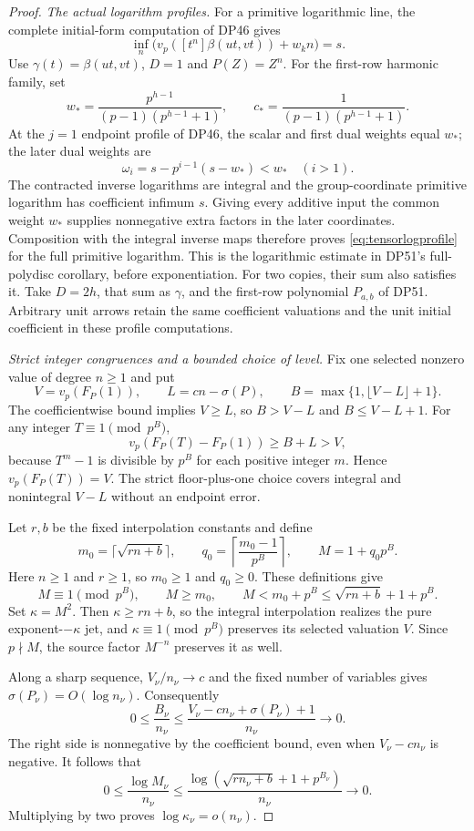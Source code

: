 \documentclass[11pt,a4paper]{article}
\theoremstyle{definition}\newtheorem{remark}[theorem]{Remark}
\begin{document}
\begin{proof}
\emph{The actual logarithm profiles.}
For a primitive logarithmic line, the complete initial-form computation of DP46 gives
\[
 \inf_n\bigl(v_p([t^n]\beta(ut,vt))+w_kn\bigr)=s.
\]
Use $\gamma(t)=\beta(ut,vt)$, $D=1$ and $P(Z)=Z^n$.
For the first-row harmonic family, set
\[
 w_*=\frac{p^{h-1}}{(p-1)(p^{h-1}+1)},
 \qquad c_*=\frac1{(p-1)(p^{h-1}+1)}.
\]
At the $j=1$ endpoint profile of DP46, the scalar and first dual weights equal $w_*$; the later dual weights are
\[
 \omega_i=s-p^{i-1}(s-w_*)<w_*\quad(i>1).
\]
The contracted inverse logarithms are integral and the group-coordinate primitive logarithm has coefficient infimum $s$.
Giving every additive input the common weight $w_*$ supplies nonnegative extra factors in the later coordinates.
Composition with the integral inverse maps therefore proves \eqref{eq:tensorlogprofile} for the full primitive logarithm.
This is the logarithmic estimate in DP51's full-polydisc corollary, before exponentiation.
For two copies, their sum also satisfies it. Take $D=2h$, that sum as $\gamma$, and the first-row polynomial $P_{a,b}$ of DP51.
Arbitrary unit arrows retain the same coefficient valuations and the unit initial coefficient in these profile computations.

\emph{Strict integer congruences and a bounded choice of level.}
Fix one selected nonzero value of degree $n\ge1$ and put
\[
 V=v_p(F_P(1)),\qquad L=cn-\sigma(P),\qquad
 B=\max\{1,\lfloor V-L\rfloor+1\}.
\]
The coefficientwise bound implies $V\ge L$, so $B>V-L$ and $B\le V-L+1$.
For any integer $T\equiv1\pmod{p^B}$,
\[
 v_p(F_P(T)-F_P(1))\ge B+L>V,
\]
because $T^m-1$ is divisible by $p^B$ for each positive integer $m$.
Hence $v_p(F_P(T))=V$.
The strict floor-plus-one choice covers integral and nonintegral $V-L$ without an endpoint error.

Let $r,b$ be the fixed interpolation constants and define
\[
 m_0=\lceil\sqrt{rn+b}\rceil,\qquad
 q_0=\left\lceil\frac{m_0-1}{p^B}\right\rceil,
 \qquad M=1+q_0p^B.
\]
Here $n\ge1$ and $r\ge1$, so $m_0\ge1$ and $q_0\ge0$.
These definitions give
\[
 M\equiv1\pmod{p^B},\qquad
 M\ge m_0,\qquad
 M<m_0+p^B\le\sqrt{rn+b}+1+p^B.
\]
Set $\kappa=M^2$. Then $\kappa\ge rn+b$, so the integral interpolation realizes the pure exponent-$-\kappa$ jet, and $\kappa\equiv1\pmod{p^B}$ preserves its selected valuation $V$.
Since $p\nmid M$, the source factor $M^{-n}$ preserves it as well.

Along a sharp sequence, $V_\nu/n_\nu\to c$ and the fixed number of variables gives $\sigma(P_\nu)=O(\log n_\nu)$.
Consequently
\[
 0\le\frac{B_\nu}{n_\nu}
 \le\frac{V_\nu-cn_\nu+\sigma(P_\nu)+1}{n_\nu}
 \longrightarrow0.
\]
The right side is nonnegative by the coefficient bound, even when $V_\nu-cn_\nu$ is negative.
It follows that
\[
 0\le\frac{\log M_\nu}{n_\nu}
 \le\frac{\log(\sqrt{rn_\nu+b}+1+p^{B_\nu})}{n_\nu}
 \longrightarrow0.
\]
Multiplying by two proves $\log\kappa_\nu=o(n_\nu)$.


\end{proof}
\end{document}
